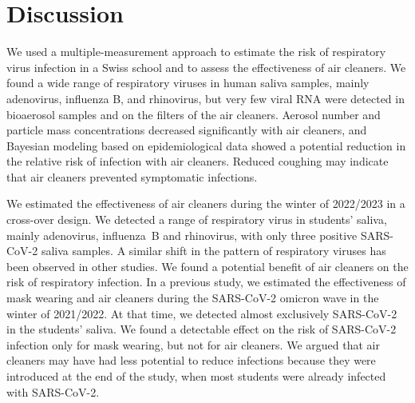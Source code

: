 \documentclass[fleqn,11pt]{wlscirep}
\begin{document}
\FloatBarrier

\newpage

\section*{Discussion}


We used a multiple-measurement approach to estimate the risk of respiratory virus infection in a Swiss school and to assess the effectiveness of air cleaners. We found a wide range of respiratory viruses in human saliva samples, mainly adenovirus, influenza B, and rhinovirus, but very few viral RNA were detected in bioaerosol samples and on the filters of the air cleaners. Aerosol number and particle mass concentrations decreased significantly with air cleaners, and Bayesian modeling based on epidemiological data showed a potential reduction in the relative risk of infection with air cleaners. Reduced coughing may indicate that air cleaners prevented symptomatic infections.


We estimated the effectiveness of air cleaners during the winter of 2022/2023 in a cross-over design. We detected a range of respiratory virus in students' saliva, mainly adenovirus, influenza~B and rhinovirus, with only three positive SARS-CoV-2 saliva samples. A similar shift in the pattern of respiratory viruses has been observed in other studies\cite{Nygaard2023Lancet,Sauteur2022EuroSurv}. We found a potential benefit of air cleaners on the risk of respiratory infection. In a previous study\cite{Banholzer2023PLoSMed}, we estimated the effectiveness of mask wearing and air cleaners during the SARS-CoV-2 omicron wave in the winter of 2021/2022. At that time, we detected almost exclusively SARS-CoV-2 in the students' saliva. We found a detectable effect on the risk of SARS-CoV-2 infection only for mask wearing, but not for air cleaners. We argued that air cleaners may have had less potential to reduce infections because they were introduced at the end of the study, when most students were already infected with SARS-CoV-2. 

\end{document}
